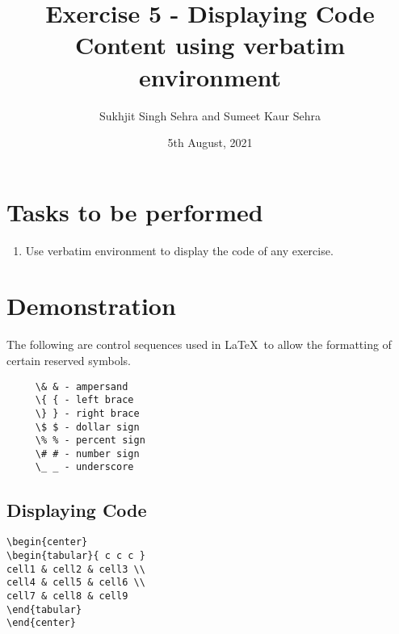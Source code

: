 \title{Exercise 5 - Displaying Code Content using verbatim environment}
\author{Sukhjit Singh Sehra and Sumeet Kaur Sehra}
\date{5th August, 2021}

	\maketitle	
	\section*{Tasks to be performed}
	\begin{enumerate}	
		\item Use verbatim environment to display the code of any exercise.
	\end{enumerate}
	\section*{Demonstration}
       
      The following are control sequences used 
     in \LaTeX\ to allow the formatting of certain 
     reserved symbols. 

     \begin{verbatim}
     \& & - ampersand 
     \{ { - left brace 
     \} } - right brace 
     \$ $ - dollar sign 
     \% % - percent sign 
     \# # - number sign 
     \_ _ - underscore 
     \end{verbatim}
\subsection*{Displaying Code}
\begin{verbatim}
\begin{center}
\begin{tabular}{ c c c }
cell1 & cell2 & cell3 \\ 
cell4 & cell5 & cell6 \\  
cell7 & cell8 & cell9    
\end{tabular}
\end{center}
\end{verbatim}
     
     